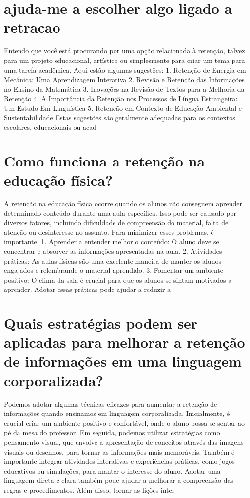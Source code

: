 \documentclass[11pt,a4paper]{article}
\begin{document}
\section{ajuda-me a escolher algo ligado a retracao}
Entendo que você está procurando por uma opção relacionada à retenção, talvez para um projeto educacional, artístico ou simplesmente para criar um tema para uma tarefa acadêmica. Aqui estão algumas sugestões: 1. Retenção de Energia em Mecânica: Uma Aprendizagem Interativa 2. Revisão e Retenção das Informações no Ensino da Matemática 3. Inovações na Revisão de Textos para a Melhoria da Retenção 4. A Importância da Retenção nos Processos de Língua Estrangeira: Um Estudo Em Linguística 5. Retenção em Contexto de Educação Ambiental e Sustentabilidade Estas sugestões são geralmente adequadas para os contextos escolares, educacionais ou acad

\section{Como funciona a retenção na educação física?}
A retenção na educação física ocorre quando os alunos não conseguem aprender determinado conteúdo durante uma aula específica. Isso pode ser causado por diversos fatores, incluindo dificuldade de compreensão do material, falta de atenção ou desinteresse no assunto. Para minimizar esses problemas, é importante: 1. Aprender a entender melhor o conteúdo: O aluno deve se concentrar e absorver as informações apresentadas na aula. 2. Atividades práticas: As aulas físicas são uma excelente maneira de manter os alunos engajados e relembrando o material aprendido. 3. Fomentar um ambiente positivo: O clima da sala é crucial para que os alunos se sintam motivados a aprender. Adotar essas práticas pode ajudar a reduzir a

\section{Quais estratégias podem ser aplicadas para melhorar a retenção de informações em uma linguagem corporalizada?}
Podemos adotar algumas técnicas eficazes para aumentar a retenção de informações quando ensinamos em linguagem corporalizada. Inicialmente, é crucial criar um ambiente positivo e confortável, onde o aluno possa se sentar ao pé da mesa do professor. Em seguida, podemos utilizar estratégias como pensamento visual, que envolve a apresentação de conceitos através das imagens visuais ou desenhos, para tornar as informações mais memoráveis. Também é importante integrar atividades interativas e experiências práticas, como jogos educativos ou simulações, para manter o interesse do aluno. Adotar uma linguagem direta e clara também pode ajudar a melhorar a compreensão das regras e procedimentos. Além disso, tornar as lições inter
\end{document}
